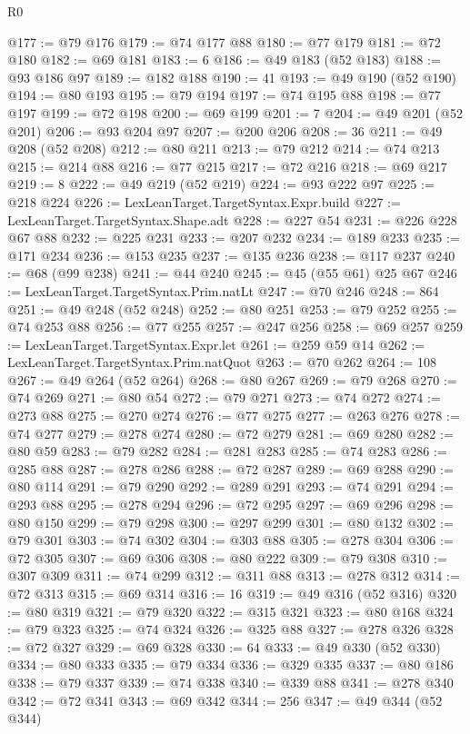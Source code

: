\begin{lexlean}{R0}
\begin{coremodule}
@177 := @79 @176
@179 := @74 @177 @88
@180 := @77 @179
@181 := @72 @180
@182 := @69 @181
@183 := 6
@186 := @49 @183 (@52 @183)
@188 := @93 @186 @97
@189 := @182 @188
@190 := 41
@193 := @49 @190 (@52 @190)
@194 := @80 @193
@195 := @79 @194
@197 := @74 @195 @88
@198 := @77 @197
@199 := @72 @198
@200 := @69 @199
@201 := 7
@204 := @49 @201 (@52 @201)
@206 := @93 @204 @97
@207 := @200 @206
@208 := 36
@211 := @49 @208 (@52 @208)
@212 := @80 @211
@213 := @79 @212
@214 := @74 @213
@215 := @214 @88
@216 := @77 @215
@217 := @72 @216
@218 := @69 @217
@219 := 8
@222 := @49 @219 (@52 @219)
@224 := @93 @222 @97
@225 := @218 @224
@226 := LexLeanTarget.TargetSyntax.Expr.build
@227 := LexLeanTarget.TargetSyntax.Shape.adt
@228 := @227 @54
@231 := @226 @228 @67 @88
@232 := @225 @231
@233 := @207 @232
@234 := @189 @233
@235 := @171 @234
@236 := @153 @235
@237 := @135 @236
@238 := @117 @237
@240 := @68 (@99 @238)
@241 := @44 @240
@245 := @45 (@55 @61) @25 @67
@246 := LexLeanTarget.TargetSyntax.Prim.natLt
@247 := @70 @246
@248 := 864
@251 := @49 @248 (@52 @248)
@252 := @80 @251
@253 := @79 @252
@255 := @74 @253 @88
@256 := @77 @255
@257 := @247 @256
@258 := @69 @257
@259 := LexLeanTarget.TargetSyntax.Expr.let
@261 := @259 @59 @14
@262 := LexLeanTarget.TargetSyntax.Prim.natQuot
@263 := @70 @262
@264 := 108
@267 := @49 @264 (@52 @264)
@268 := @80 @267
@269 := @79 @268
@270 := @74 @269
@271 := @80 @54
@272 := @79 @271
@273 := @74 @272
@274 := @273 @88
@275 := @270 @274
@276 := @77 @275
@277 := @263 @276
@278 := @74 @277
@279 := @278 @274
@280 := @72 @279
@281 := @69 @280
@282 := @80 @59
@283 := @79 @282
@284 := @281 @283
@285 := @74 @283
@286 := @285 @88
@287 := @278 @286
@288 := @72 @287
@289 := @69 @288
@290 := @80 @114
@291 := @79 @290
@292 := @289 @291
@293 := @74 @291
@294 := @293 @88
@295 := @278 @294
@296 := @72 @295
@297 := @69 @296
@298 := @80 @150
@299 := @79 @298
@300 := @297 @299
@301 := @80 @132
@302 := @79 @301
@303 := @74 @302
@304 := @303 @88
@305 := @278 @304
@306 := @72 @305
@307 := @69 @306
@308 := @80 @222
@309 := @79 @308
@310 := @307 @309
@311 := @74 @299
@312 := @311 @88
@313 := @278 @312
@314 := @72 @313
@315 := @69 @314
@316 := 16
@319 := @49 @316 (@52 @316)
@320 := @80 @319
@321 := @79 @320
@322 := @315 @321
@323 := @80 @168
@324 := @79 @323
@325 := @74 @324
@326 := @325 @88
@327 := @278 @326
@328 := @72 @327
@329 := @69 @328
@330 := 64
@333 := @49 @330 (@52 @330)
@334 := @80 @333
@335 := @79 @334
@336 := @329 @335
@337 := @80 @186
@338 := @79 @337
@339 := @74 @338
@340 := @339 @88
@341 := @278 @340
@342 := @72 @341
@343 := @69 @342
@344 := 256
@347 := @49 @344 (@52 @344)

\end{coremodule}
\end{lexlean}
